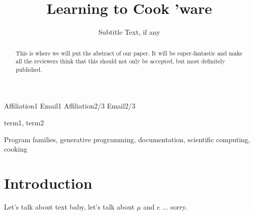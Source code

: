\documentclass[10pt, preprint]{sigplanconf}
\begin{document}
\setlength{\pdfpageheight}{\paperheight}
\setlength{\pdfpagewidth}{\paperwidth}






\title{Learning to Cook 'ware}
\subtitle{Subtitle Text, if any} %

           {Affiliation1}
           {Email1}
           {Affiliation2/3}
           {Email2/3}

\maketitle

\begin{abstract}
This is where we will put the abstract of our paper. It will be super-fantastic and make all the reviewers think that this should not only be accepted, but most definitely published.
\end{abstract}


\terms
term1, term2

\keywords
Program families, generative programming, documentation, scientific computing, cooking %

\section{Introduction} %

Let's talk about text baby, let's talk about $\mu$ and $e$
... sorry.
\end{document}
